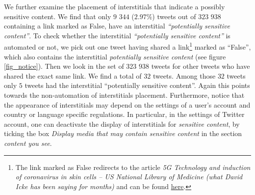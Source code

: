 \documentclass{article}
\begin{document}
\smallskip

We further examine the placement of interstitials that indicate a possibly sensitive content. We find that only $9$ $344$ ($2.97\%$) tweets out of $323$ $938$ containing a link marked as False, have an interstitial {\it ``potentially sensitive content''}. To check whether the interstitial {\it ``potentially sensitive content''} is automated or not, we pick out one tweet having shared a link\footnote{The link marked as False redirects to the article {\it 5G Technology and induction of coronavirus in skin cells – US National Library of Medicine (what David Icke has been saying for months) } and can be found \href{https://davidicke.com/2020/07/22/5g-technology-and-induction-of-coronavirus-in-skin-cells-us-national-library-of-medicine-what-david-icke-has-been-saying-for-months/}{here}.} marked as ``False'', which also contains the interstitial {\it potentially sensitive content} (see figure \ref{fig_notice}). Then we look in the set of $323$ $938$ tweets for other tweets who have shared the exact same link. We find a total of $32$ tweets. Among those $32$ tweets only $5$ tweets had the interstitial ``potentially sensitive content''. Again this points towards the non-automation of interstitials placement. Furthermore, notice that the appearance of interstitials may depend on the settings of a user's account and country or language specific regulations. In particular, in the settings of Twitter account, one can deactivate the display of interstitials for {\it sensitive content}, by ticking the box {\it Display media that may contain sensitive content} in the section {\it content you see}. 

\smallskip
\end{document}

